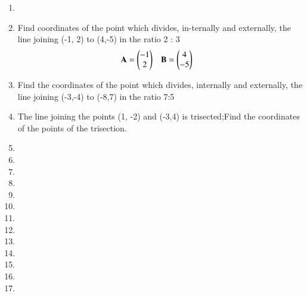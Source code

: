 \begin{enumerate}[label=\thesubsection.\arabic*.,ref=\thesubsection.\theenumi]
\item 
\item 
Find coordinates of the point which divides, in-ternally and externally, the line joining (-1, 2) to (4,-5) in the ratio 2 : 3
\begin{align}
\mathbf{A}&=\begin{pmatrix}-1\\2\end{pmatrix} & \mathbf{B}&=\begin{pmatrix}4\\-5\end{pmatrix}
\end{align}
\solution
 

\item Find the coordinates of the point which divides, internally and externally, the line joining (-3,-4) to (-8,7) in the ratio 7:5
\\
\solution
 
%
\item The line joining the points (1, -2) and (-3,4) is  trisected;Find the coordinates of the points of the trisection.
\\
\solution
 

\item 
\item 
\item 
\item 
\item 
\item 
\item 
\item 
\item 
\item 
\item 
\item 
\item 

\end{enumerate}
